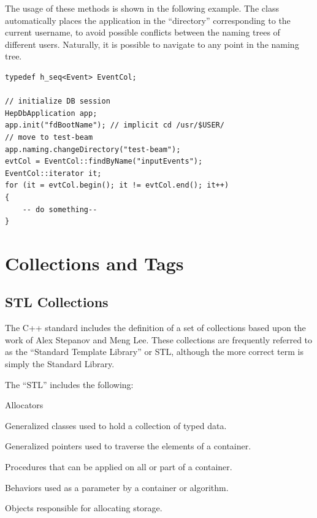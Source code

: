 \par

The usage of these methods is shown in the following example. The
 class automatically places the application
in the ``directory'' corresponding to the current username, to
avoid possible conflicts between the naming trees of different users.
Naturally, it is possible to navigate to any point in the naming tree.

\begin{verbatim}
typedef h_seq<Event> EventCol; 

// initialize DB session 
HepDbApplication app; 
app.init("fdBootName"); // implicit cd /usr/$USER/ 
// move to test-beam 
app.naming.changeDirectory("test-beam"); 
evtCol = EventCol::findByName("inputEvents"); 
EventCol::iterator it; 
for (it = evtCol.begin(); it != evtCol.end(); it++) 
{ 
    -- do something-- 
}
\end{verbatim}
\chapter{Collections and Tags\label{H1CollectionsTags}}
\section{STL Collections}

\par

The C++ standard includes the definition of a set of collections based upon the work
of Alex Stepanov and Meng Lee. These collections are frequently referred to as
the ``Standard Template Library'' or STL, although the more correct
term is simply the Standard Library.

\par

The ``STL'' includes the following:\begin{DLtt}{Allocators}
\item[Containers]Generalized classes used to hold a collection of typed data.
\item[Iterators]Generalized pointers used to traverse the elements of a container.
\item[Algorithms]Procedures that can be applied on all or part of a container.
\item[Function Objects]Behaviors used as a parameter by a container or algorithm.
\item[Allocators]Objects responsible for allocating storage.
\end{DLtt}

